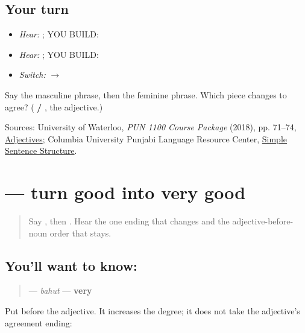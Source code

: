 \subsection*{Your turn}
\begin{itemize}
\raggedright
  \item \emph{Hear:} \textbf{}; YOU BUILD: \textbf{ }
  \item \emph{Hear:} \textbf{}; YOU BUILD: \textbf{ }
  \item \emph{Switch:} \textbf{  $\to$  }
\end{itemize}

\begin{tcolorbox}[breakable,colback=teal!4,colframe=teal!35!black,title={Before you move on}]
Say the masculine phrase, then the feminine phrase. Which piece changes to agree? (\textbf{ / }, the adjective.)

Sources: University of Waterloo, \emph{PUN 1100 Course Package} (2018), pp. 71–74, \href{https://openlibrary-repo.ecampusontario.ca/jspui/bitstream/123456789/492/2/2018Pun1100CoursePackage.pdf}{Adjectives}; Columbia University Punjabi Language Resource Center, \href{https://punjabi.lrc.columbia.edu/?page\_id=101}{Simple Sentence Structure}.
\end{tcolorbox}
\section[\texorpdfstring{\pa{ਬਹੁਤ} (bahut)}{ਬਹੁਤ (bahut)}]{ — turn good into very good}

\label{lesson:PA-C177-bahut}



\begin{quote}
Say \textbf{ }, then \textbf{ }. Hear the one ending that changes and the adjective-before-noun order that stays.
\end{quote}

\subsection*{You'll want to know: }
\begin{quote}
\textbf{} — \emph{bahut} — \textbf{very}
\end{quote}

Put \textbf{} before the adjective. It increases the degree; it does not take the adjective's agreement ending:

